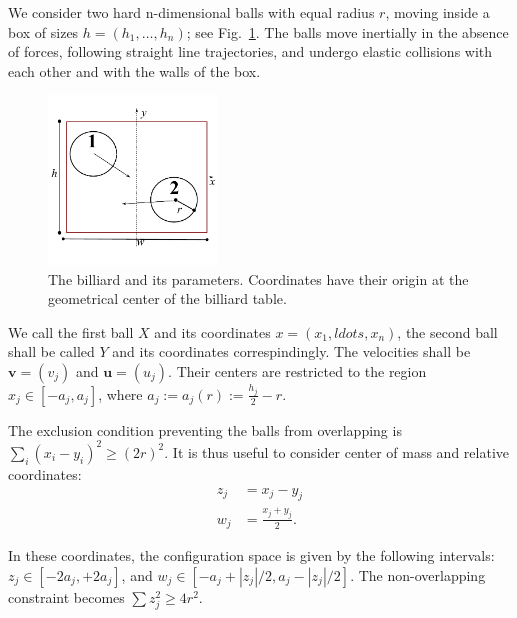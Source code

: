 \documentclass[superscriptaddress,pre,reprint,showpacs,twocolumn]{revtex4-1}
\newcommand{\defeq}{:=}
\begin{document}
We consider two hard n-dimensional balls  with equal radius $r$,
moving inside a box of sizes $h=(h_1, \ldots , h_n )$; see Fig.~\ref{billar01}. 
The balls move inertially in the absence of forces, 
following straight line trajectories,
and undergo elastic collisions with each 
other and with the walls of the box.

\begin{figure}[h]
  \begin{center}
    \includegraphics[width=0.40\textwidth]{figures/DiscsBox01.pdf}
  \end{center}
  \caption{The billiard and its parameters. Coordinates
    have their origin at the geometrical center of the 
    billiard table.}\label{billar01}
\end{figure}


We call the first ball $X$ and its coordinates $ x=(x_1,ldots,x_n)$,
the second ball shall be called $Y$ and its coordinates correspindingly.
The velocities shall be  $\mathbf{v} = (v_j)$ and $\mathbf{u} = (u_j)$. 
Their centers are restricted to the region 
$x_j \in [-a_j,a_j] $, where 
$a_j \defeq a_j(r) \defeq \frac{h_j}{2} - r $.

The exclusion condition preventing the balls from overlapping is $ \sum_i (x_i-y_i)^2  \ge (2r)^2$.
It is thus useful to consider center of mass and relative coordinates:
\begin{equation}\label{cambiocoor01}
 \begin{aligned}
z_j & = x_j -y_j \\
w_j & = \frac{x_j +y_j}{2} .
  \end{aligned}
\end{equation}

In these coordinates, the configuration space is given by the following
intervals:
$z_j \in [-2a_j , +2a_j]$, and
$w_j \in [-a_j + |z_j|/2, a_j - |z_j|/2]$.
The non-overlapping constraint becomes $\sum z_j^2 \ge 4 r^2$.
\end{document}
